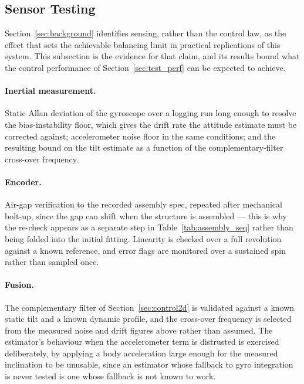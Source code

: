 \subsection{Sensor Testing}
\label{sec:test_sensors}

Section~\ref{sec:background} identifies sensing, rather than the control law, as
the effect that sets the achievable balancing limit in practical replications of
this system. This subsection is the evidence for that claim, and its results
bound what the control performance of Section~\ref{sec:test_perf} can be expected
to achieve.

\paragraph{Inertial measurement.} Static Allan deviation of the gyroscope over a
logging run long enough to resolve the bias-instability floor, which gives the
drift rate the attitude estimate must be corrected against; accelerometer noise
floor in the same conditions; and the resulting bound on the tilt estimate as a
function of the complementary-filter cross-over frequency.

\paragraph{Encoder.} Air-gap verification to the recorded assembly spec, repeated
after mechanical bolt-up, since the gap can shift when the structure is
assembled --- this is why the re-check appears as a separate step in
Table~\ref{tab:assembly_seq} rather than being folded into the initial fitting.
Linearity is checked over a full revolution against a known reference, and error
flags are monitored over a sustained spin rather than sampled once.

\paragraph{Fusion.} The complementary filter of Section~\ref{sec:control2d} is
validated against a known static tilt and a known dynamic profile, and the
cross-over frequency is selected from the measured noise and drift figures above
rather than assumed. The estimator's behaviour when the accelerometer term is
distrusted is exercised deliberately, by applying a body acceleration large
enough for the measured inclination to be unusable, since an estimator whose
fallback to gyro integration is never tested is one whose fallback is not known
to work.

